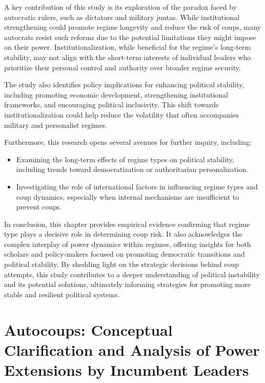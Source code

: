 \documentclass[
  12pt,
]{report}
\providecommand{\tightlist}{%
  \setlength{\itemsep}{0pt}\setlength{\parskip}{0pt}}\usepackage{longtable,booktabs,array}
\begin{document}
A key contribution of this study is its exploration of the paradox faced
by autocratic rulers, such as dictators and military juntas. While
institutional strengthening could promote regime longevity and reduce
the risk of coups, many autocrats resist such reforms due to the
potential limitations they might impose on their power.
Institutionalization, while beneficial for the regime's long-term
stability, may not align with the short-term interests of individual
leaders who prioritize their personal control and authority over broader
regime security.

The study also identifies policy implications for enhancing political
stability, including promoting economic development, strengthening
institutional frameworks, and encouraging political inclusivity. This
shift towards institutionalization could help reduce the volatility that
often accompanies military and personalist regimes.

Furthermore, this research opens several avenues for further inquiry,
including:

\begin{itemize}
\tightlist
\item
  Examining the long-term effects of regime types on political
  stability, including trends toward democratization or authoritarian
  personalization.
\item
  Investigating the role of international factors in influencing regime
  types and coup dynamics, especially when internal mechanisms are
  insufficient to prevent coups.
\end{itemize}

In conclusion, this chapter provides empirical evidence confirming that
regime type plays a decisive role in determining coup risk. It also
acknowledges the complex interplay of power dynamics within regimes,
offering insights for both scholars and policy-makers focused on
promoting democratic transitions and political stability. By shedding
light on the strategic decisions behind coup attempts, this study
contributes to a deeper understanding of political instability and its
potential solutions, ultimately informing strategies for promoting more
stable and resilient political systems.

\chapter{Autocoups: Conceptual Clarification and Analysis of Power
Extensions by Incumbent Leaders}\label{sec-chapter3}
\end{document}
